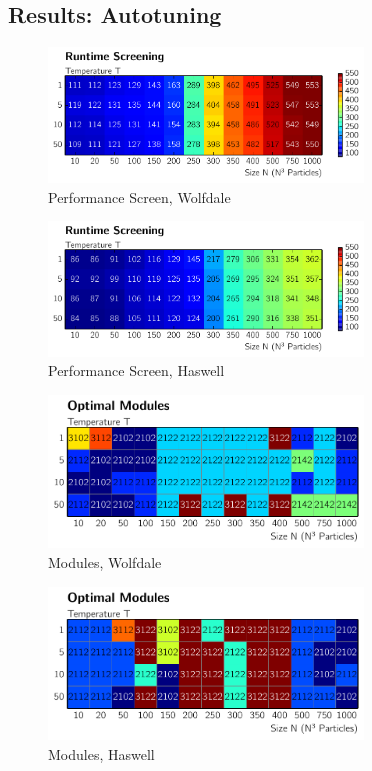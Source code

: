 \documentclass[letterpaper]{article}
\begin{document}
\subsection{Results: Autotuning}
	\begin{figure}[h]\centering
	  \includegraphics[width = 8.36cm]{plots/matrix_msk.pdf}
	  \caption{Performance Screen, Wolfdale}
	\end{figure}
	\begin{figure}[h]\centering
	  \includegraphics[width = 8.36cm]{plots/matrix_dg.pdf}
	  \caption{Performance Screen, Haswell}
	\end{figure}
	\begin{figure}[h]\centering
	  \includegraphics[width = 8.36cm]{plots/module_msk2.pdf}
	  \caption{Modules, Wolfdale}
	\end{figure}
	
	\begin{figure}[h]\centering
		  \includegraphics[width = 8.36cm]{plots/module_dg2.pdf}
		  \caption{Modules, Haswell}
	\end{figure}
	
\end{document}
